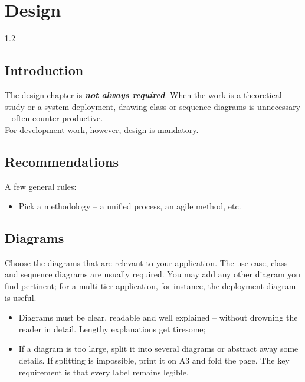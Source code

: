 \setcounter{chapter}{1}
\chapter{Design}
\minitoc
\graphicspath{{Chapter2/figures/}}

\pagestyle{fancy}
\fancyhf{}
\fancyhead[R]{\bfseries\rightmark}
\fancyfoot[R]{\thepage}
\renewcommand{\headrulewidth}{0.5pt}
\renewcommand{\footrulewidth}{0pt}
\renewcommand{\chaptermark}[1]{\markboth{\MakeUppercase{\chaptername~\thechapter.\ #1}}{}}
\renewcommand{\sectionmark}[1]{\markright{\thechapter.\thesection~ #1}}

\begin{spacing}{1.2}
\section*{Introduction}
The design chapter is \textbf{\textsl{not always required}}. When the work is
a theoretical study or a system deployment, drawing class or sequence diagrams
is unnecessary -- often counter-productive.\\
For development work, however, design is mandatory.

\section{Recommendations}
A few general rules:
\begin{itemize}
  \item Pick a methodology -- a unified process, an agile method, etc.
\end{itemize}

\section{Diagrams}
Choose the diagrams that are relevant to your application. The use-case,
class and sequence diagrams are usually required. You may add any other
diagram you find pertinent; for a multi-tier application, for instance, the
deployment diagram is useful.
\begin{itemize}
  \item Diagrams must be clear, readable and well explained -- without
        drowning the reader in detail. Lengthy explanations get tiresome;
  \item If a diagram is too large, split it into several diagrams or abstract
        away some details. If splitting is impossible, print it on A3 and fold
        the page. The key requirement is that every label remains legible.
\end{itemize}


\end{spacing}
